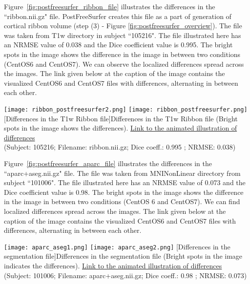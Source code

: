 Figure~\ref{fig:postfreesurfer_ribbon_file} illustrates the differences in the ``ribbon.nii.gz" file. PostFreeSurfer creates this file as a part of generation of cortical ribbon volume (step (3) - Figure \ref{fig:postfreesurfer_overview}). The file was taken from T1w directory in subject ``105216". The file illustrated here has an NRMSE value of 0.038 and the Dice coefficient value is 0.995. The bright spots in the image shows the difference in the image in between two conditions (CentOS6 and CentOS7). We can observe the localized differences spread across the images. The link given below at the caption of the image contains the visualized CentOS6 and CentOS7 files with differences, alternating in between each other.

\begin{center}
\texttt{[image: ribbon\_postfreesurfer2.png]}%
\texttt{[image: ribbon\_postfreesurfer.png]}
[Differences in the T1w Ribbon file]{Differences in the T1w Ribbon file (Bright spots in the image shows the differences). \href{https://drive.google.com/file/d/1KGEvLP4bltu5k6m9tttoTuhehaH3ldGk/view?usp=sharing}{Link to the animated illustration of differences}\\(Subject: 105216; Filename: ribbon.nii.gz; Dice coeff.: 0.995 ; NRMSE: 0.038)}
\label{fig:postfreesurfer_ribbon_file}
\end{center}

Figure~\ref{fig:postfreesurfer_aparc_file} illustrates the differences in the ``aparc+aseg.nii.gz" file. The file was taken from MNINonLinear directory from subject ``101006". The file illustrated here has an NRMSE value of 0.073 and the Dice coefficient value is 0.98. The bright spots in the image shows the difference in the image in between two conditions (CentOS 6 and CentOS7). We can find localized differences spread across the images. The link given below at the caption of the image contains the visualized CentOS6 and CentOS7 files with differences, alternating in between each other.

\begin{center}
\texttt{[image: aparc\_aseg1.png]}%
\texttt{[image: aparc\_aseg2.png]}%
[Differences in the segmentation file]{Differences in the segmentation file (Bright spots in the image indicates the differences). \href{https://drive.google.com/file/d/1_ZyAtveS1oVle8tAXeKsp1_4KdS2MVoB/view?usp=sharing}{Link to the animated illustration of differences}\\(Subject: 101006; Filename: aparc+aseg.nii.gz; Dice coeff.: 0.98 ; NRMSE: 0.073)}
\label{fig:postfreesurfer_aparc_file}
\end{center}

